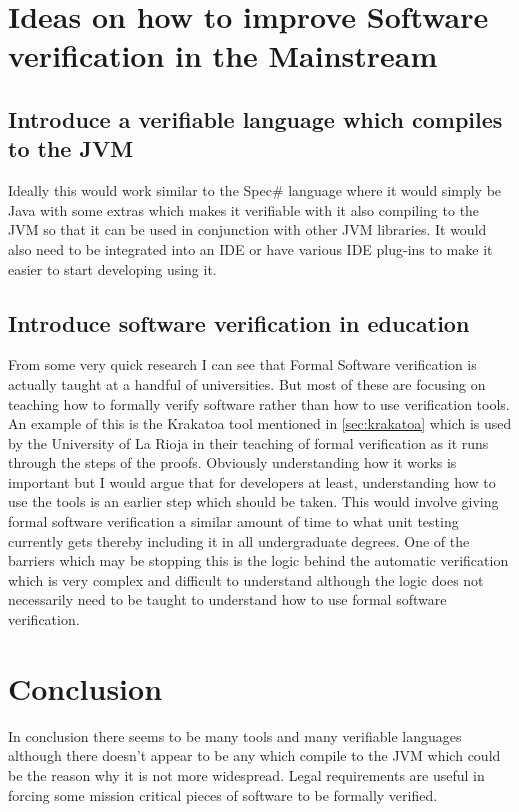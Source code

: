 \documentclass[a4paper,12pt]{scrartcl}
\begin{document}
	\section{Ideas on how to improve Software verification in the Mainstream}
	{
		\subsection{Introduce a verifiable language which compiles to the JVM}
		{
			Ideally this would work similar to the Spec\# language where it would simply be Java with some extras which makes it verifiable with it also compiling to the JVM so that it can be used in conjunction with other JVM libraries. It would also need to be integrated into an IDE or have various IDE plug-ins to make it easier to start developing using it.
		}
		\subsection{Introduce software verification in education}
		{
			From some very quick research I can see that Formal Software verification is actually taught at a handful of universities. But most of these are focusing on teaching how to formally verify software rather than  how to use verification tools. An example of this is the Krakatoa tool mentioned in \cref{sec:krakatoa} which is used by the University of La Rioja in their teaching of formal verification as it runs through the steps of the proofs\cite{Romero2018}. Obviously understanding how it works is important but I would argue that for developers at least, understanding how to use the tools is an earlier step which should be taken. This would involve giving formal software verification a similar amount of time to what unit testing currently gets thereby including it in all undergraduate degrees. One of the barriers which may be stopping this is the logic behind the automatic verification which is very complex and difficult to understand although the logic does not necessarily need to be taught to understand how to use formal software verification. 
		}
	}
	
	\section{Conclusion}
	{
		In conclusion there seems to be many tools and many verifiable languages although there doesn't appear to be any which compile to the JVM which could be the reason why it is not more widespread. Legal requirements are useful in forcing some mission critical pieces of software to be formally verified.
	}
	
	\newpage
	
	\printbibliography[heading=bibintoc,title=References]
\end{document}
